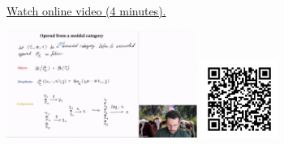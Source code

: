 
\begin{minipage}{10cm}
    \href{https://act4e-spring21.netlify.app/videos/spring2021-operads-a:operad-monoidal-cat.html}{Watch online video (4 minutes).}
        
    \href{https://act4e-spring21.netlify.app/videos/spring2021-operads-a:operad-monoidal-cat.html}{\includegraphics[height=3.5cm]{spring2021-operads-a:operad-monoidal-cat/thumbnails.jpg}}
    \href{https://act4e-spring21.netlify.app/videos/spring2021-operads-a:operad-monoidal-cat.html}{\includegraphics[height=2.5cm]{spring2021-operads-a:operad-monoidal-cat/qrcode.png}}
\end{minipage}
